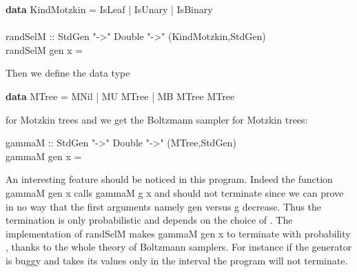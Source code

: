 \documentclass{sig-alternate}
\begin{document}
\begin{figure*}[!t]
\begin{haskell}
  \hspace*{-20pt}\textbf{data} KindMotzkin = IsLeaf | IsUnary | IsBinary \\
  ~\\
  \hspace*{-20pt}randSelM :: StdGen "->"  Double "->" (KindMotzkin,StdGen)\\
  \hspace*{-20pt}randSelM gen x = 
\end{haskell}
Then we define the data type
\begin{haskell}
  \textbf{data} MTree = MNil | MU MTree | MB MTree MTree
\end{haskell}
for Motzkin trees and we get the Boltzmann sampler for Motzkin trees:
\begin{haskell}
  \hspace*{-20pt}gammaM :: StdGen "->" Double "->" (MTree,StdGen) \\
  \hspace*{-20pt}gammaM gen x = 
\end{haskell}
An interesting feature should be noticed in this program.  Indeed the function
\<gammaM gen x\> calls \<gammaM g x\> and should not terminate since we can prove in
no way that the first arguments namely \<gen\> versus \<g\> decrease. Thus the
termination is only probabilistic and depends on the choice of .  The
implementation of \<randSelM\> makes \<gammaM gen x\> to terminate with
probability , thanks to the whole theory of Boltzmann samplers. For instance if
the generator is buggy and takes its values only in the interval 
the program will not terminate.


\end{figure*}
\end{document}

